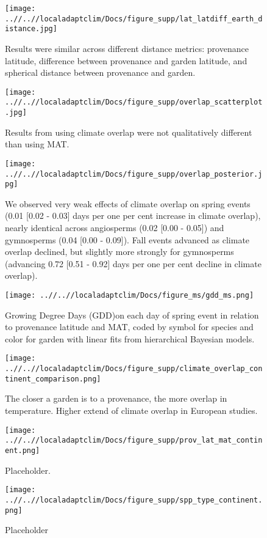 \documentclass{article}
\begin{document}
\begin{figure}[!h] 
    \centering
 \texttt{[image: ..//..//localadaptclim/Docs/figure\_supp/lat\_latdiff\_earth\_distance.jpg]}
    \caption{Results were similar across different distance metrics: provenance latitude, difference between provenance and garden latitude, and spherical distance between provenance and garden.}
    \label{figure:lat_distance}
\end{figure}


\begin{figure}[!h] 
    \centering
 \texttt{[image: ..//..//localadaptclim/Docs/figure\_supp/overlap\_scatterplot.jpg]}
    \caption{Results from using climate overlap were not qualitatively different than using MAT.}
    \label{figure:overlap_scatterplot}
\end{figure}


\begin{figure}[!h] 
    \centering
 \texttt{[image: ..//..//localadaptclim/Docs/figure\_supp/overlap\_posterior.jpg]}
    \caption{We observed very weak effects of climate overlap on spring events (0.01 [0.02 - 0.03] days per one per cent increase in climate overlap), nearly identical across angiosperms (0.02 [0.00 - 0.05]) and gymnosperms (0.04 [0.00 - 0.09]). Fall events advanced as climate overlap declined, but slightly more strongly for gymnosperms
(advancing 0.72 [0.51 - 0.92] days per one per cent decline in climate overlap).}
    \label{figure:overlap_posterior}
\end{figure}



\begin{figure}[!h] 
    \centering
 \texttt{[image: ..//..//localadaptclim/Docs/figure\_ms/gdd\_ms.png]}
    \caption{Growing Degree Days (GDD)on each day of spring event in relation to provenance latitude and MAT, coded by symbol for species and color for garden with linear fits from hierarchical Bayesian models.}
    \label{figure:gdd}
\end{figure}


\begin{figure}[!h] 
    \centering
 \texttt{[image: ..//..//localadaptclim/Docs/figure\_supp/climate\_overlap\_continent\_comparison.png]}
    \caption{The closer a garden is to a provenance, the more overlap in temperature. 
Higher extend of climate overlap in European studies.}
    \label{figure:overlap_continent}
\end{figure}

\begin{figure}[!h] 
    \centering
 \texttt{[image: ..//..//localadaptclim/Docs/figure\_supp/prov\_lat\_mat\_continent.png]}
    \caption{Placeholder.}
    \label{figure:lat_mat_continent}
\end{figure}


\begin{figure}[!h] 
    \centering
 \texttt{[image: ..//..//localadaptclim/Docs/figure\_supp/spp\_type\_continent.png]}
    \caption{Placeholder}
    \label{figure:spp_continent}
\end{figure}
\end{document}
